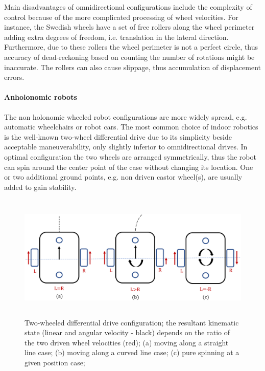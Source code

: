 \documentclass[12pt,english,twoside]{article}
\begin{document}
Main disadvantages of omnidirectional configurations include the complexity of control because of the more complicated processing of wheel velocities. For instance, the Swedish wheels have a set of free rollers along the wheel perimeter adding extra degrees of freedom, i.e. translation in the lateral direction. Furthermore, due to these rollers the wheel perimeter is not a perfect circle, thus accuracy of dead-reckoning based on counting the number of rotations might be inaccurate. The rollers can also cause slippage, thus accumulation of displacement errors. \cite{sieg}

\paragraph{Anholonomic robots}
The non holonomic wheeled robot configurations are more widely spread, e.g. automatic wheelchairs or robot cars. The most common choice of indoor robotics is the well-known two-wheel differential drive due to its simplicity beside acceptable maneuverability, only slightly inferior to omnidirectional drives. In optimal configuration the two wheels are arranged symmetrically, thus the robot can spin around the center point of the case without changing its location. One or two additional ground points, e.g. non driven castor wheel(s), are usually added to gain stability. 
\begin{figure}[htb!]
	\centering
	\includegraphics[height=6cm]{figures/differential.png}
	\caption{Two-wheeled differential drive configuration; the resultant kinematic state (linear and angular velocity - black) depends on the ratio of the two driven wheel velocities (red); (a) moving along a straight line case; (b) moving along a curved line case; (c) pure spinning at a given position case;}
	\label{differential}
\end{figure}
\end{document}
